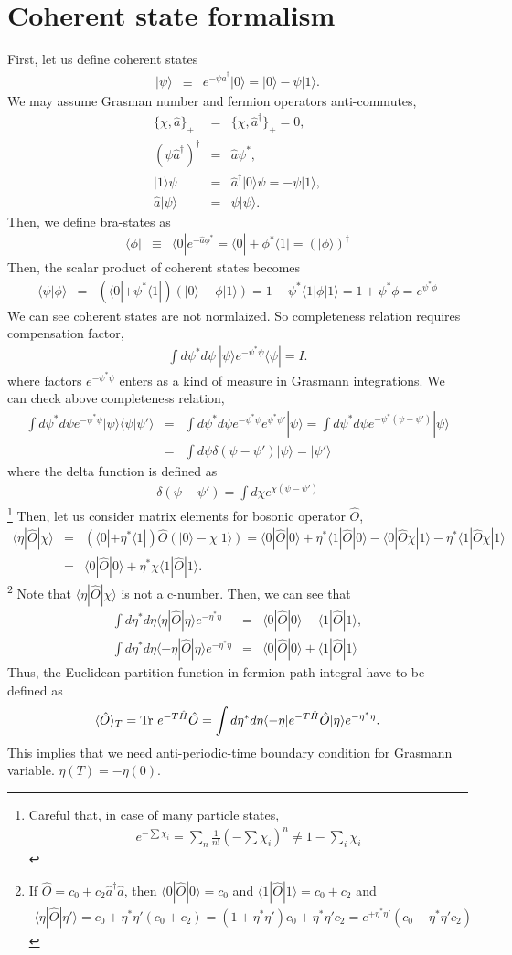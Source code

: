 \documentclass[10pt]{book}
\newcommand{\bea}{\begin{eqnarray}}
\newcommand{\eea}{\end{eqnarray}}
\newcommand{\no}{\nonumber \\}
\def\la{\langle}
\def\ra{\rangle}
\begin{document}
\section{Coherent state formalism}
First, let us define coherent states
\bea
|\psi\ra&\equiv& e^{-\psi \hat{a}^\dagger} |0\ra
         =|0\ra -\psi |1\ra.
\eea
We may assume Grasman number and fermion operators anti-commutes,
\bea
\{\chi, \hat{a}\}_{+}&=&\{\chi, \hat{a}^\dagger\}_{+}=0,\no   
(\psi \hat{a}^\dagger)^\dagger&=& \hat{a}\psi^*,\no 
|1\ra \psi &=& \hat{a}^\dagger|0\ra \psi= -\psi|1\ra,\no 
\hat{a}|\psi\ra&=& \psi|\psi\ra. 
\eea
Then, we define bra-states as
\bea                      
\la \phi|&\equiv& \la 0| e^{-\hat{a}\phi^*}
         =\la 0|+\phi^*\la 1|=(|\phi\ra)^\dagger             
\eea 
Then, the scalar product of coherent states becomes
\bea
\la \psi|\phi\ra &=&(\la 0|+\psi^*\la 1|)(|0\ra -\phi |1\ra)
                  =1-\psi^*\la 1|\phi |1\ra
                  =1+\psi^*\phi=e^{\psi^*\phi}  
\eea
We can see coherent states are not normlaized. 
So completeness
relation requires compensation factor,
\bea
\int d\psi^* d\psi\ |\psi\ra e^{-\psi^*\psi} \la\psi|=I.
\eea
where factors $e^{-\psi^*\psi}$ 
enters as a kind of measure in Grasmann integrations. We can check above 
completeness relation,
\bea 
\int d\psi^* d\psi e^{-\psi^*\psi}|\psi\ra \la \psi|\psi'\ra 
&=& \int d\psi^* d\psi e^{-\psi^*\psi}e^{\psi^*\psi'} |\psi\ra 
  = \int d\psi^* d\psi e^{-\psi^*(\psi-\psi')} |\psi\ra \no 
  &=& \int d\psi \delta(\psi-\psi')|\psi\ra
  =|\psi'\ra 
\eea 
where the delta function is defined as
\bea
\delta(\psi-\psi')
= \int d\chi e^{\chi(\psi-\psi')} 
\eea
\footnote{
Careful that, in case of many particle states, 
\bea
e^{-\sum \chi_i}=\sum_n \frac{1}{n!}(-\sum\chi_i)^n \neq 1-\sum_i \chi_i
\eea 
}
Then, let us consider matrix elements for bosonic operator $\hat{O}$,
\bea
\la \eta|\hat{O}|\chi\ra
&=&(\la 0|+\eta^*\la 1|)\hat{O}(|0\ra-\chi|1\ra)
=\la 0|\hat{O}|0\ra+\eta^*\la 1|\hat{O}|0\ra
       -\la 0|\hat{O}\chi|1\ra -\eta^*\la 1|\hat{O}\chi|1\ra \no 
&=&\la 0|\hat{O}|0\ra+\eta^* \chi\la 1|\hat{O}|1\ra.                      
\eea
\footnote{
If $\hat{O}=c_0+c_2 \hat{a}^\dagger \hat{a}$, then
$\la 0|\hat{O}|0\ra=c_0$ and $\la 1|\hat{O}|1\ra=c_0+c_2$ and
\bea
\la \eta|\hat{O}|\eta'\ra=c_0+\eta^*\eta'(c_0+c_2)
      = (1+\eta^*\eta')c_0+\eta^*\eta' c_2
      =e^{+\eta^*\eta'}(c_0+\eta^*\eta' c_2)
\eea
}
Note that $\la \eta|\hat{O}|\chi\ra$ is not a c-number.
Then, we can see that
\bea
\int d\eta^* d\eta \la \eta|\hat{O}|\eta\ra e^{-\eta^*\eta}
    &=& \la 0|\hat{O}|0\ra -\la 1|\hat{O}|1\ra,\no 
\int d\eta^* d\eta \la -\eta|\hat{O}|\eta\ra e^{-\eta^*\eta}
    &=& \la 0|\hat{O}|0\ra +\la 1|\hat{O}|1\ra    
\eea
Thus, the Euclidean partition function in fermion path integral
have to be defined as
\bea
\la \hat{O}\ra_T={\rm Tr}\ e^{-T\hat{H}}\hat{O}
=\int d\eta^* d\eta \la -\eta| e^{-T\hat{H}} \hat{O}|\eta\ra e^{-\eta^*\eta}. 
\eea
This implies that we need anti-periodic-time boundary condition
for Grasmann variable. $\eta(T)=-\eta(0)$.
\end{document}
